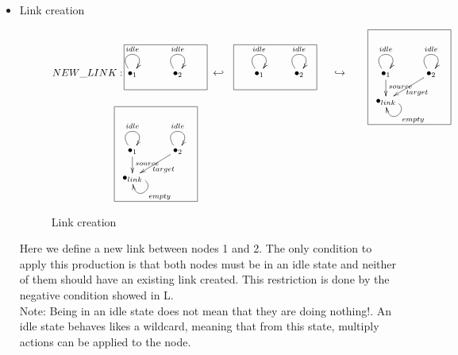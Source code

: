 \documentclass[envcountsect,runningheads]{llncs}
\begin{document}
\begin{itemize}
  \item Link creation
  \begin{figure}[H]
    \[
       \xymatrix@C=25pt@R=16pt
       {
        {\bullet}_{1}\ar@(ul,ur)^{idle} \POS[]-<3.8pc,0pc>\drop{NEW\_LINK:}
         \POS[]-<.4pc,-0.5pc> &
         {\bullet}_{2}\ar@(ul,ur)^{idle}
         \POS[]+<.4pc,0pc>
         \POS[]-<1pc,-0.5pc>*+=<7pc,3.8pc>[F-]{} & {\hookleftarrow} &
         {\bullet}_{1}\ar@(ul,ur)^{idle} 
         \POS[]-<.4pc,-0.5pc> &
         {\bullet}_{2}\ar@(ul,ur)^{idle}
         \POS[]+<.4pc,-0.5pc>
         \POS[]-<2pc,-0.5pc>*+=<7pc,3.8pc>[F-]{} & {\hookrightarrow} 
         \POS[]+<4.6pc,0.5pc> *+=<7pc,3.8pc>[]{} &
         {\bullet}_{1}\ar@(ul,ur)^{idle}\ar@{->}^{source}[d]
         \POS[]+<0pc,.5pc> &
         {\bullet}_{2} \ar@(ul,ur)^{idle}\ar@{->}^{target}[dl]
         \\
         & & & & & & {\bullet}_{link}\ar@(r,d)^{empty} \POS[]+<2pc,2pc>*+=<7pc,8pc>[F-]{} \POS[]-<-0.5pc,.5pc>
         \\
         \\
         {\bullet}_{1}\ar@(ul,ur)^{idle}\ar@{->}^{source}[d] \POS[]-<3.8pc,0pc>
         \POS[]-<.4pc,-0.5pc> &
         {\bullet}_{2}\ar@(ul,ur)^{idle}\ar@{->}^{target}[dl]
         \POS[]+<.4pc,0pc>
         \\
         {\bullet}_{link}\ar@(r,d)^{empty} \POS[]+<2pc,2pc>*+=<7pc,8pc>[F-]{} \POS[]-<-0.5pc,.5pc>
       }
    \]
    \caption{Link creation}
    \protect\label{fig:linkcreation}
  \end{figure}
  Here we define a new link between nodes 1 and 2. The only condition to apply 
  this production is that both nodes must be in an idle state and neither of them should have an existing 
  link created. This restriction is done by the negative condition showed in L.\\
  Note: Being in an idle state does not mean that they are doing nothing!. An 
  idle state behaves likes a wildcard, meaning that from this state, multiply actions 
  can be applied to the node.\\
  

\end{itemize}
\end{document}
